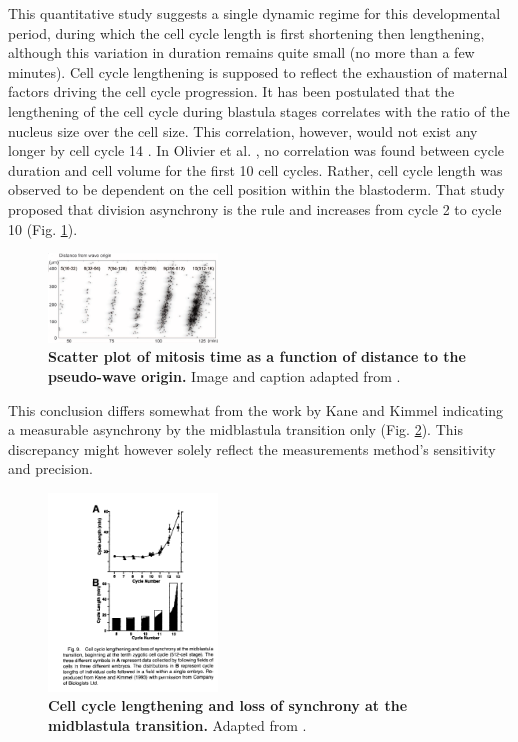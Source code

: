 This quantitative study suggests a single dynamic regime for this developmental period, during which the cell cycle length is first shortening then lengthening, although this variation in duration remains quite small (no more than a few minutes). Cell cycle lengthening is supposed to reflect the exhaustion of maternal factors driving the cell cycle progression. It has been postulated that the lengthening of the cell cycle during blastula stages correlates with the ratio of the nucleus size over the cell size. This correlation, however, would not exist any longer by cell cycle 14 \cite{Kane:1996uk}. In Olivier et al. \cite{Olivier:2010jz}, no correlation was found between cycle duration and cell volume for the first 10 cell cycles. Rather, cell cycle length was observed to be dependent on the cell position within the blastoderm. That study proposed that division asynchrony is the rule and increases from cycle 2 to cycle 10 (Fig. \ref{Case_1_Division_Olivieretal2}).
\begin{figure}
\begin{center}
\includegraphics[width=0.4\textwidth]{../../images/Cases_Studies/Case_1_Division/Olivieretal2.png}
\end{center}
\caption{\textbf{Scatter plot of mitosis time as a function of distance to the pseudo-wave origin.} Image and caption adapted from \cite{Olivier:2010jz}.}
\label{Case_1_Division_Olivieretal2}
\end{figure}

This conclusion differs somewhat from the work by Kane and Kimmel \cite{Kane:1993wp} indicating a measurable asynchrony by the midblastula transition only (Fig. \ref{kane_kimmel_1993_cell_cycle}). This discrepancy might however solely reflect the measurements method's sensitivity and precision.
\begin{figure}
\begin{center}
\includegraphics[width=0.4\textwidth]{../../images/Cases_Studies/Case_1_Division/kane_kimmel_1993_cell_cycle.png}
\end{center}
\caption{\textbf{Cell cycle lengthening and loss of synchrony at the midblastula transition.} Adapted from \cite{Kane:1993wp}.}
\label{kane_kimmel_1993_cell_cycle}
\end{figure}

